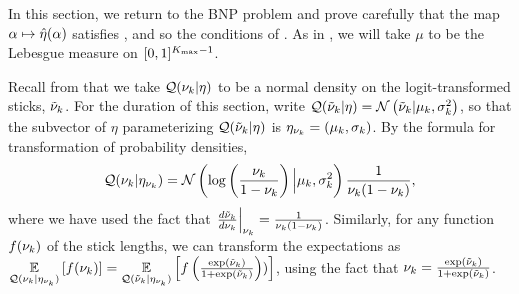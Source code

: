 In this section, we return to the BNP problem and prove carefully that the map
$\alpha \mapsto \hat\eta(\alpha)$ satisfies ,
and so the conditions of .  As in ,
we will take $\mu$ to be the Lebesgue measure on $[0,1]^{{K_{\mathrm{max}}} - 1}$.

Recall from  that we take $\mathcal{Q}(\nu_{k} \vert \eta)$ to be a normal
density on the logit-transformed sticks, $\tilde{\nu}_k$.  For the duration of
this section, write $\mathcal{Q}(\tilde{\nu}_{k} \vert \eta) = \mathcal{N}\left(\tilde{\nu}_{k} \vert \mu_k,
\sigma^2_k\right)$, so that the subvector of $\eta$ parameterizing $\mathcal{Q}(\tilde{\nu}_{k} \vert
\eta)$ is $\eta_{\nu_{k}} = (\mu_k, \sigma_k)$.
%
By the formula for transformation of probability densities,
%
\begin{align*}
%
\q(\nuk \vert \etanuk) =
    \normdist{\log\left(\frac{\nu_\k}{1 - \nu_\k} \right)
        \Big\vert  \mu_\k, \sigma^2_\k}
    \frac{1}{\nuk (1 - \nuk)},
%
\end{align*}
%
where we have used the fact that $\left.\frac{d \tilde{\nu}_k}{ d\nu_{k}}\right\vert_{\nu_{k}} =
\frac{1}{\nu_{k} (1 - \nu_{k})}$.  Similarly, for any function $f(\nu_{k})$ of the stick
lengths, we can transform the expectations as $\underset{\mathcal{Q}(\nu_{k} \vert
\eta_{\nu_{k}})}{\mathbb{E}}\left[f(\nu_{k})\right] = \underset{\mathcal{Q}(\tilde{\nu}_{k} \vert \eta_{\nu_{k}})}{\mathbb{E}}\left[f\left(
\frac{\exp(\tilde{\nu}_{k})}{1 + \exp(\tilde{\nu}_{k})}  \right))\right]$, using the fact that
$\nu_{k} = \frac{\exp(\tilde{\nu}_{k})}{1 + \exp(\tilde{\nu}_{k})}$.

